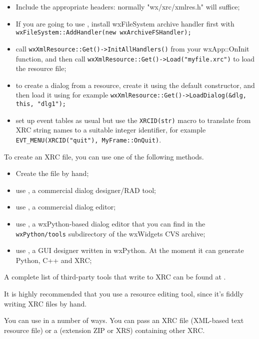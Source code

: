 \begin{itemize}\itemsep=0pt
\item Include the appropriate headers: normally "wx/xrc/xmlres.h" will suffice;
\item If you are going to use , install
wxFileSystem archive handler first with {\tt wxFileSystem::AddHandler(new wxArchiveFSHandler);}
\item call {\tt wxXmlResource::Get()->InitAllHandlers()} from your wxApp::OnInit function,
and then call {\tt wxXmlResource::Get()->Load("myfile.xrc")} to load the resource file;
\item to create a dialog from a resource, create it using the default constructor, and then
load it using for example {\tt wxXmlResource::Get()->LoadDialog(\&dlg, this, "dlg1");}
\item set up event tables as usual but use the {\tt XRCID(str)} macro to translate from XRC string names
to a suitable integer identifier, for example {\tt EVT\_MENU(XRCID("quit"), MyFrame::OnQuit)}.
\end{itemize}

To create an XRC file, you can use one of the following methods.

\begin{itemize}\itemsep=0pt
\item Create the file by hand;
\item use , a commercial dialog designer/RAD tool;
\item use , a commercial dialog editor;
\item use , a wxPython-based
dialog editor that you can find in the {\tt wxPython/tools} subdirectory of the wxWidgets
CVS archive;
\item use , a GUI designer written in wxPython. At the moment it can generate Python, C++ and XRC;
\end{itemize}

A complete list of third-party tools that write to XRC can be found at .

It is highly recommended that you use a resource editing tool, since it's fiddly writing
XRC files by hand.

You can use  in a number of ways.
You can pass an XRC file (XML-based text resource file)
or a  (extension ZIP or XRS) containing other XRC.


